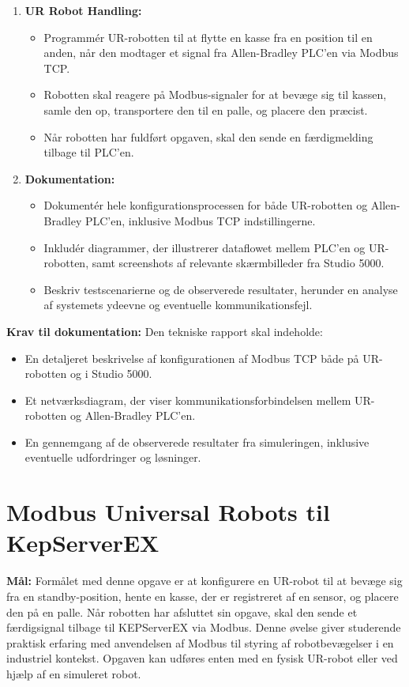 \begin{enumerate}
	\item \textbf{UR Robot Handling:}
	\begin{itemize}
		\item Programmér UR-robotten til at flytte en kasse fra en position til en anden, når den modtager et signal fra Allen-Bradley PLC'en via Modbus TCP.
		\item Robotten skal reagere på Modbus-signaler for at bevæge sig til kassen, samle den op, transportere den til en palle, og placere den præcist.
		\item Når robotten har fuldført opgaven, skal den sende en færdigmelding tilbage til PLC'en.
	\end{itemize}
	
	\item \textbf{Dokumentation:}
	\begin{itemize}
		\item Dokumentér hele konfigurationsprocessen for både UR-robotten og Allen-Bradley PLC'en, inklusive Modbus TCP indstillingerne.
		\item Inkludér diagrammer, der illustrerer dataflowet mellem PLC'en og UR-robotten, samt screenshots af relevante skærmbilleder fra Studio 5000.
		\item Beskriv testscenarierne og de observerede resultater, herunder en analyse af systemets ydeevne og eventuelle kommunikationsfejl.
	\end{itemize}
\end{enumerate}

\textbf{Krav til dokumentation:}
Den tekniske rapport skal indeholde:
\begin{itemize}
	\item En detaljeret beskrivelse af konfigurationen af Modbus TCP både på UR-robotten og i Studio 5000.
	\item Et netværksdiagram, der viser kommunikationsforbindelsen mellem UR-robotten og Allen-Bradley PLC'en.
	\item En gennemgang af de observerede resultater fra simuleringen, inklusive eventuelle udfordringer og løsninger.
\end{itemize}


\section{Modbus Universal Robots til KepServerEX}
\label{subsec:modbus_tcp_ur_echo}

\textbf{Mål:} Formålet med denne opgave er at konfigurere en UR-robot til at bevæge sig fra en standby-position, hente en kasse, der er registreret af en sensor, og placere den på en palle. Når robotten har afsluttet sin opgave, skal den sende et færdigsignal tilbage til KEPServerEX via Modbus. Denne øvelse giver studerende praktisk erfaring med anvendelsen af Modbus til styring af robotbevægelser i en industriel kontekst. Opgaven kan udføres enten med en fysisk UR-robot eller ved hjælp af en simuleret robot.

